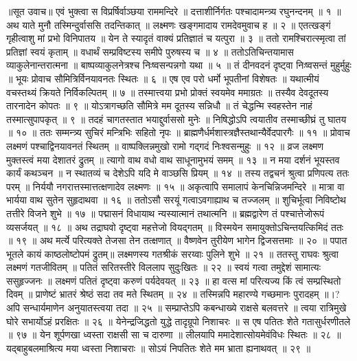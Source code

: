 ॥सूत उवाच॥
एवं भुक्त्वा स विप्रर्षिर्वाञ्छया राममन्दिरे ॥
दत्ताशीर्निर्गतः पश्चादामन्त्र्य रघुनन्दनम् ॥ १ ॥
अथ याते मुनौ तस्मिन्दुर्वाससि तदन्तिकात् ॥
लक्ष्मणः खङ्गमादाय रामदेवमुवाच ह ॥ २ ॥
एतत्खङ्गं गृहीत्वाशु मां प्रभो विनिपातय ॥
येन ते स्यादृतं वाक्यं प्रतिज्ञातं च यत्पुरा ॥ ३ ॥
ततो रामश्चिरात्स्मृत्वा तां प्रतिज्ञां स्वयं कृताम् ॥
वधार्थं सम्प्रविष्टस्य समीपे पुरुषस्य च ॥ ४ ॥
ततोऽतिचिन्तयामास व्याकुलेनान्तरात्मना ॥
बाष्पव्याकुलनेत्रश्च निःष्वसन्पन्नगो यथा ॥ ५ ॥
तं दीनवदनं दृष्ट्वा निःष्वसन्तं मुहुर्मुहुः ॥
भूयः प्रोवाच सौमित्रिर्विनयावनतः स्थितः ॥ ६ ॥
एष एव परो धर्मो भूपतीनां विशेषतः ॥
यथात्मीयं वचस्तथ्यं क्रियते निर्विकल्पितम् ॥ ७ ॥
तस्मात्त्वया प्रभो प्रोक्तं स्वयमेव ममाग्रतः ॥
तस्यैव देवदूतस्य तारनादेन कोपतः ॥ ९ ॥
योऽत्रागच्छति सौमित्रे मम दूतस्य सन्निधौ ॥
तं चेद्धन्मि स्वहस्तेन नाहं तस्मात्सुपापकृत् ॥ ९ ॥
तदहं चागतस्तात भयाद्दुर्वाससो मुनेः ॥
निषिद्धोऽपि त्वयातीव तस्माच्छीघ्रं तु घातय ॥ १० ॥
ततः सम्मन्त्र्य सुचिरं मन्त्रिभिः सहितो नृपः ॥
ब्राह्मणैर्धर्मशास्त्रज्ञैस्तथान्यैर्वेदपारगैः ॥ ११ ॥
प्रोवाच लक्ष्मणं पश्चाद्विनयावनतं स्थितम् ॥
वाष्पक्लिन्नमुखो रामो गद्गदं निःश्वसन्मुहुः ॥ १२ ॥
व्रज लक्ष्मण मुक्तस्त्वं मया देशातरं द्रुतम् ॥
त्यागो वाथ वधो वाथ साधूनामुभयं समम् ॥ १३ ॥
न मया दर्शनं भूयस्तव कार्यं कथञ्चन ॥
न स्थातव्यं च देशेऽपि यदि मे वाञ्छसि प्रियम् ॥ १४ ॥
तस्य तद्वचनं श्रुत्वा प्रणिपत्य ततः परम् ॥
निर्ययौ नगरात्तस्मात्तत्क्षणादेव लक्ष्मणः ॥ १५ ॥
अकृत्वापि समालापं केनचिन्निजमन्दिरे ॥
मात्रा वा भार्यया वाथ सुतेन सुहृदाथवा ॥ १६ ॥
ततोऽसौ सरयूं गत्वाऽवगाह्याथ च तज्जलम् ॥
शुचिर्भूत्वा निविष्टोथ तत्तीरे विजने शुभे ॥ १७ ॥
पद्मासनं विधायाथ न्यस्यात्मानं तथात्मनि ॥
ब्रह्मद्वारेण तं पश्चात्तेजोरूपं व्यसर्जयत् ॥ १८ ॥
अथ तद्राघवो दृष्ट्वा महत्तेजो वियद्गतम् ॥
विस्मयेन समायुक्तोऽचिन्तयत्किमिदं ततः ॥ १९ ॥
अथ मर्त्ये परित्यक्ते तेजसा तेन तत्क्षणात् ॥
वैष्णवेन तुरीयेण भागेन द्विजसत्तमाः ॥ २० ॥
पपात भूतले कायं काष्ठलोष्टोपमं द्रुतम्॥
लक्ष्मणस्य गतश्रीकं सरय्वाः पुलिने शुभे ॥ २१ ॥
ततस्तु राघवः श्रुत्वा लक्ष्मणं गतजीवितम् ॥
पतितं सरितस्तीरे विललाप सुदुःखितः ॥ २२ ॥
स्वयं गत्वा तमुद्देशं सामात्यः ससुहृज्जनः ॥
लक्ष्मणं पतितं दृष्ट्वा करुणं पर्यदेवयत् ॥ २३ ॥
हा वत्स मां परित्यज्य किं त्वं सम्प्रस्थितो दिवम् ॥
प्राणेष्टं भ्रातरं श्रेष्ठं सदा तव मते स्थितम् ॥ २४ ॥
तस्मिन्नपि महारण्ये गच्छमानः पुरादहम् ॥।?
अपि सन्धार्यमाणेन अनुयातस्त्वया तदा ॥ २५ ॥
सम्प्राप्तेऽपि कबन्धाख्ये राक्षसे बलवत्तरे ॥
त्वया रात्रिमुखे घोरे सभार्योऽहं प्ररक्षितः ॥ २६ ॥
येनेन्द्रजिद्धतो युद्धे तादृग्रूपो निशाचरः ॥
स एष पतितः शेते गतासुर्धरणीतले ॥ ९७ ॥
येन शूर्पणखा ध्वस्ता राक्षसी सा च दारुणा ॥
लीलयापि ममादेशात्सोयमेवंविधः स्थितः ॥ २८ ॥
यद्बाहुबलमाश्रित्य मया ध्वस्ता निशाचराः ॥
सोऽयं निपतितः शेते मम भ्राता ह्यनाथवत् ॥ २९ ॥
